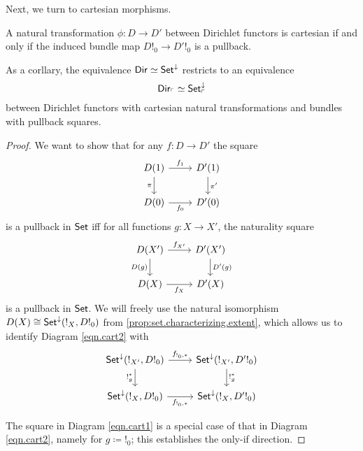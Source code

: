 Next, we turn to cartesian morphisms.
\begin{prop}
A natural transformation $\phi : D \to D'$ between Dirichlet functors is
cartesian if and only if the induced bundle map $D!_0 \to D'!_0$ is a pullback.

As a corllary, the equivalence $\operatorname{\mathsf{{Dir}}} \simeq \operatorname{\mathsf{{Set}}}^{\mathbin{\downarrow}}$ restricts to an
equivalence
$$\operatorname{\mathsf{{Dir}}}_{\ulcorner} \simeq \operatorname{\mathsf{{Set}}}^{\mathbin{\downarrow}}_{\ulcorner}$$
between Dirichlet functors with cartesian natural transformations and bundles with
pullback squares.
\end{prop}
\begin{proof}
  
We want to show that for any $f\colon D\to D'$ the square
\begin{equation}\label{eqn.cart1}
\begin{tikzcd}
	D(1)\ar[r, "f_1"]\ar[d, "\pi"']&
	D'(1)\ar[d, "\pi'"]\\
	D(0)\ar[r, "f_0"']&
	D'(0)
\end{tikzcd}
\end{equation}
is a pullback in $\operatorname{\mathsf{{Set}}}$ iff for all functions $g\colon X\to X'$, the naturality square
\begin{equation}\label{eqn.cart2}
\begin{tikzcd}
  D(X')\ar[r, "f_{X'}"]\ar[d, "D(g)"']&
  D'(X')\ar[d, "D'(g)"]\\
  D(X)\ar[r, "f_X"']&
  D'(X)
\end{tikzcd}
\end{equation}
is a pullback in $\operatorname{\mathsf{{Set}}}$. We will freely use the natural isomorphism
$D(X)\cong\operatorname{\mathsf{{Set}}}^{\mathbin{\downarrow}}(!_X, D!_0)$ from
\ref{prop:set.characterizing.extent}, which allows us to identify Diagram
\ref{eqn.cart2} with
\begin{equation}\label{eqn.cart3}
\begin{tikzcd}
 \Set^{\down}(!_{X'}, D!_0)     \ar[r, "f_{!_0,\ast}"]\ar[d, "!_g^{\ast}"']& \Set^{\down}(!_{X'}, D'!_0)
  \ar[d, "!_{g}^{\ast}"]\\
  \Set^{\down}(!_{X}, D!_0)\ar[r, "f_{!_0, \ast}"']&
 \Set^{\down}(!_X, D'!_0) 
\end{tikzcd}
\end{equation}

The square in Diagram \ref{eqn.cart1} is a
special case of that in Diagram \ref{eqn.cart2}, namely for $g\coloneqq !_0$;
this establishes the only-if direction. 


\end{proof}
